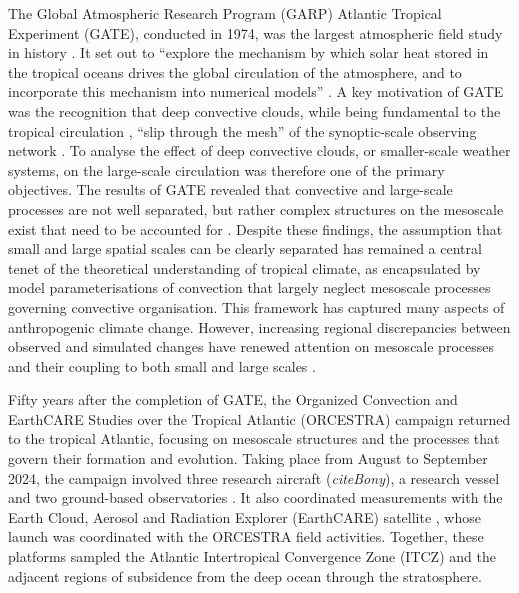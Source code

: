 \documentclass[acp, manuscript]{copernicus}
\begin{document}
The Global Atmospheric Research Program (GARP) Atlantic Tropical Experiment (GATE), conducted in 1974, was the largest atmospheric field study in history \citep{zhangRelocationGATEPacific2022}.
It set out to ``explore the mechanism by which solar heat stored in the tropical oceans drives the global circulation of the atmosphere, and to incorporate this mechanism into numerical models'' \citep{kuettnerGeneralDescriptionCentral1974}.
A key motivation of GATE was the recognition that deep convective clouds, while being fundamental to the tropical circulation \citep{riehlHeatBalanceEquatorial1958}, ``slip through the mesh'' of the synoptic-scale observing network \citep{kuettnerGeneralDescriptionCentral1974}.
To analyse the effect of deep convective clouds, or smaller-scale weather systems, on the large-scale circulation was therefore one of the primary objectives.
The results of GATE revealed that convective and large-scale processes are not well separated, but rather complex structures on the mesoscale exist that need to be accounted for \citep{houzejr.ConvectionGATE1981}.
Despite these findings, the assumption that small and large spatial scales can be clearly separated has remained a central tenet of the theoretical understanding of tropical climate, as encapsulated by model parameterisations of convection that largely neglect mesoscale processes governing convective organisation.
This framework has captured many aspects of anthropogenic climate change.
However, increasing regional discrepancies between observed and simulated changes have renewed attention on mesoscale processes and their coupling to both small and large scales \citep{shawOtherClimateCrisis2025}.

Fifty years after the completion of GATE, the Organized Convection and EarthCARE Studies over the Tropical Atlantic (ORCESTRA) campaign \citep{stevensORCESTRAOrganizedConvection2026} returned to the tropical Atlantic, focusing on mesoscale structures and the processes that govern their formation and evolution.
Taking place from August to September 2024, the campaign involved three research aircraft (\textit{citeBony}), a research vessel \citep{klocke40DaysNights2026} and two ground-based observatories \citep{winklerRAPSODIRadiosondeAtmospheric2026}. 
It also coordinated measurements with the Earth Cloud, Aerosol and Radiation Explorer (EarthCARE) satellite \citep{illingworthEarthCARESatelliteNext2015, wehrEarthCAREMissionScience2023}, whose launch was coordinated with the ORCESTRA field activities.
Together, these platforms sampled the Atlantic Intertropical Convergence Zone (ITCZ) and the adjacent regions of subsidence from the deep ocean through the stratosphere.
\end{document}
